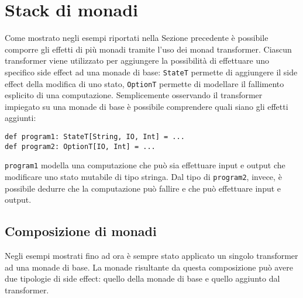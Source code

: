 \section{Stack di monadi}
\label{sec:stack-di-monadi}

Come mostrato negli esempi riportati nella Sezione precedente è possibile comporre gli effetti di più monadi tramite l'uso dei monad transformer. Ciascun transformer viene utilizzato per aggiungere la possibilità di effettuare uno specifico side effect ad una monade di base: \lstinline{StateT} permette di aggiungere il side effect della modifica di uno stato, \lstinline{OptionT} permette di modellare il fallimento esplicito di una computazione.
Semplicemente osservando il transformer impiegato su una monade di base è possibile comprendere quali siano gli effetti aggiunti:
\begin{lstlisting}[language=scala3]
def program1: StateT[String, IO, Int] = ...
def program2: OptionT[IO, Int] = ...
\end{lstlisting}
\lstinline{program1} modella una computazione che può sia effettuare input e output che modificare uno stato mutabile di tipo stringa. Dal tipo di \lstinline{program2}, invece, è possibile dedurre che la computazione può fallire e che può effettuare input e output.

\subsection{Composizione di monadi}
Negli esempi mostrati fino ad ora è sempre stato applicato un singolo transformer ad una monade di base. La monade risultante da questa composizione può avere due tipologie di side effect: quello della monade di base e quello aggiunto dal transformer.

